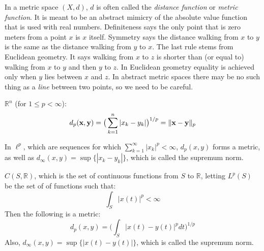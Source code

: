         In a metric space $(X,d)$, $d$ is often called the
        \textit{distance function} or
        \textit{metric function}. It is meant to be an
        abstract mimicry of the absolute value function
        that is used with real numbers. Definiteness
        says the only point that is zero meters from a
        point $x$ is $x$ itself. Symmetry says the distance
        walking from $x$ to $y$ is the same as the distance
        walking from $y$ to $x$. The last rule stems from
        Euclidean geometry. It says walking from $x$ to $z$
        is shorter than (or equal to) walking from
        $x$ to $y$ and then $y$ to $z$. In Euclidean
        geometry equality is achieved only when
        $y$ lies between $x$ and $z$. In
        abstract metric spaces there may be no such
        thing as a \textit{line} between two points,
        so we need to be careful.
        \begin{example}
            $\mathbb{R}^{n}$ (for $1\leq{p}<\infty$):
            \begin{equation*}
                d_{p}(\mathbf{x},\mathbf{y})=
                \big(
                    \sum_{k=1}^{n}|x_{k}-y_{k}|
                \big)^{1/p}
                =\lVert\mathbf{x}-\mathbf{y}\rVert_{p}
            \end{equation*}
        \end{example}
        \begin{example}
            In $\ell^{p}$, which are sequences for
            which
            $\sum_{k=1}^{\infty}|x_{k}|^{p}<\infty$,
            $d_{p}(x,y)$ forms a metric, as well
            as
            $d_{\infty}(x,y)=\sup\{|x_{k}-y_{k}|\}$,
            which is called the supremum norm.
        \end{example}
        \begin{example}
            $C(S,\mathbb{R})$, which is the
            set of continuous functions from
            $S$ to $\mathbb{R}$, letting
            $L^{p}(S)$ be the set of of functions
            such that:
            \begin{equation*}
                \int_{S}|x(t)|^{p}<\infty
            \end{equation*}
            Then the following is a metric:
            \begin{equation*}
                d_{p}(x,y)=
                \bigg(
                    \int_{S}|x(t)-y(t)|^{p}dt
                \bigg)^{1/p}
            \end{equation*}
            Also,
            $d_{\infty}(x,y)=\sup\{|x(t)-y(t)|\}$,
            which is called the supremum norm.
        \end{example}
